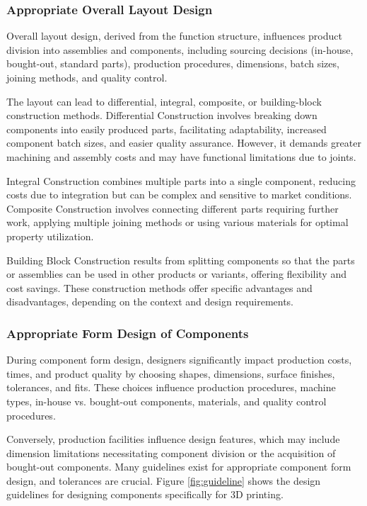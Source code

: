 \subsubsection{Appropriate Overall Layout Design}
Overall layout design, derived from the function structure, influences product division into assemblies and components, including sourcing decisions (in-house, bought-out, standard parts), production procedures, dimensions, batch sizes, joining methods, and quality control.

The layout can lead to differential, integral, composite, or building-block construction methods. Differential Construction involves breaking down components into easily produced parts, facilitating adaptability, increased component batch sizes, and easier quality assurance. However, it demands greater machining and assembly costs and may have functional limitations due to joints.

Integral Construction combines multiple parts into a single component, reducing costs due to integration but can be complex and sensitive to market conditions. Composite Construction involves connecting different parts requiring further work, applying multiple joining methods or using various materials for optimal property utilization.

Building Block Construction results from splitting components so that the parts or assemblies can be used in other products or variants, offering flexibility and cost savings. These construction methods offer specific advantages and disadvantages, depending on the context and design requirements.

\subsubsection{Appropriate Form Design of Components}
During component form design, designers significantly impact production costs, times, and product quality by choosing shapes, dimensions, surface finishes, tolerances, and fits. These choices influence production procedures, machine types, in-house vs. bought-out components, materials, and quality control procedures.

Conversely, production facilities influence design features, which may include dimension limitations necessitating component division or the acquisition of bought-out components. Many guidelines exist for appropriate component form design, and tolerances are crucial.
Figure \ref{fig:guideline} shows the design guidelines for designing components specifically for 3D printing.

